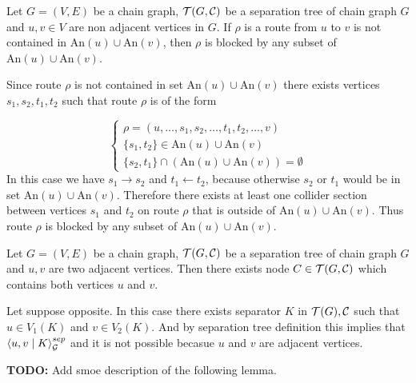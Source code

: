 \begin{lemma} \label{lemma10}
	Let $G = (V, E)$ be a chain graph, $\mathcal{T}(G, \mathcal{C})$ be a separation tree of chain graph $G$ and $u, v \in V$ are non adjacent vertices in $G$.
	If $\rho$ is a route from $u$ to $v$ is not contained in $\mbox{An}(u) \cup  \mbox{An}(v)$, then $\rho$ is blocked by any subset of
	$\mbox{An}(u) \cup  \mbox{An}(v)$.
\end{lemma}

\begin{prf}
	Since route $\rho$ is not contained in set $\mbox{An}(u) \cup  \mbox{An}(v)$ there exists vertices $s_1, s_2, t_1, t_2$ such that 
	route $\rho$ is of the form

	\begin{equation}
		\begin{cases}
			\rho = \left(u, \dots, s_1, s_2, \dots, t_1, t_2, \dots, v \right)   \\ 
			\{ s_1, t_2 \} \in \mbox{An}(u) \cup  \mbox{An}(v)  \\ 
			\{ s_2, t_1 \} \cap \left(\mbox{An}(u) \cup  \mbox{An}(v) \right) = \emptyset	
		\end{cases}
	\end{equation}
	In this case we have $s_1 \rightarrow s_2$ and $t_1 \leftarrow t_2$, because otherwise $s_2$ or $t_1$ would be in set 
	$\mbox{An}(u) \cup  \mbox{An}(v)$. Therefore there exists at least one collider section between vertices $s_1$ and $t_2$ 
	on route $\rho$ that is outside of $\mbox{An}(u) \cup  \mbox{An}(v)$. Thus route $\rho$ is blocked by 
	any subset of $\mbox{An}(u) \cup  \mbox{An}(v)$.
	\QED
\end{prf}


\begin{lemma} \label{lemma12}
	Let $G = (V, E)$ be a chain graph, $\mathcal{T}(G, \mathcal{C})$ be a separation tree of chain graph $G$
	and $u, v$ are two adjacent vertices. Then there exists node $C \in \mathcal{T}(G, \mathcal{C})$ which contains both vertices $u$ and $v$.
\end{lemma}

\begin{prf}
	Let suppose opposite. In this case there exists separator $K$ in $\mathcal{T}(G), \mathcal{C}$ such that $u \in V_1(K)$ and $v \in V_2(K)$.
	And by separation tree definition this implies that $\left\langle u , v \mid K \right\rangle_{\mathcal{G}}^{sep}$ and it is not possible becasue $u$ and $v$ are adjacent vertices.
	\QED
\end{prf}



\textbf{TODO:} Add smoe description of the following lemma.


